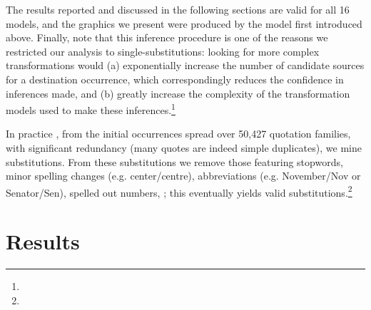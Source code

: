 \begin{new}
The results reported and discussed in the following sections are valid for all 16 models, and the graphics we present were produced by the model first introduced above.
Finally, note that this inference procedure is one of the reasons we restricted our analysis to single-substitutions:
looking for more complex transformations would
(a) exponentially increase the number of candidate sources for a destination occurrence, which correspondingly reduces the confidence in inferences made,
and (b) greatly increase the complexity of the transformation models used to make these inferences.\footnote{
}

\end{new}

\medskip

In practice , from the  initial occurrences spread over 50,427 quotation families, with significant redundancy (many quotes are indeed simple duplicates), we mine  substitutions.
From these substitutions we remove those featuring stopwords, minor spelling changes (\hbox{e.g.} center/centre), abbreviations (\hbox{e.g.} November/Nov or Senator/Sen), spelled out numbers, ;
this eventually yields  valid substitutions.\footnote{
}

\section{Results}\label{sec:results}

